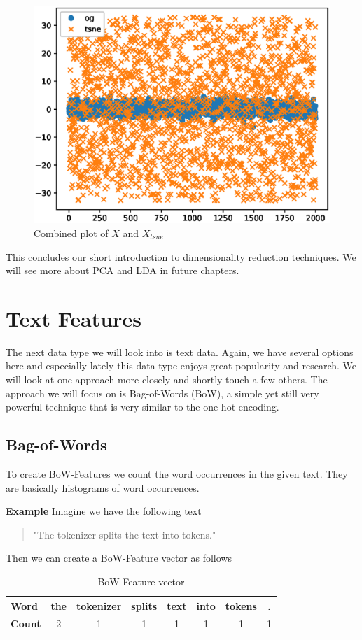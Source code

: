 \begin{figure}
\begin{minipage}[t]{.3\textwidth}
    \includegraphics[width=.95\textwidth]{images/tsne-3.eps}
    \caption{Combined plot of $X$ and $X_{tsne}$}
    \label{fig:tsne-3}
\end{minipage}
\end{figure}
This concludes our short introduction to dimensionality reduction techniques. We will see more about PCA and LDA in future chapters.

\section{Text Features}
The next data type we will look into is text data. Again, we have several options here and especially lately this data type enjoys great popularity and research.
We will look at one approach more closely and shortly touch a few others.
The approach we will focus on is Bag-of-Words (BoW), a simple yet still very powerful technique that is very similar to the one-hot-encoding.
\subsection{Bag-of-Words}
To create BoW-Features we count the word occurrences in the given text. They are basically histograms of word occurrences.

\textbf{Example} Imagine we have the following text
\begin{quote}
  "The tokenizer splits the text into tokens."
\end{quote}
Then we can create a BoW-Feature vector as follows

\begin{table}[h]
  \centering
  \begin{tabular}{|l|ccccccc|}
    \hline
    \textbf{Word} & the & tokenizer & splits & text & into & tokens & . \\
    \hline
    \textbf{Count} & 2 & 1 & 1 & 1 & 1 & 1 & 1 \\
    \hline
  \end{tabular}
  \caption{BoW-Feature vector}
  \label{tab:bow}
\end{table}

